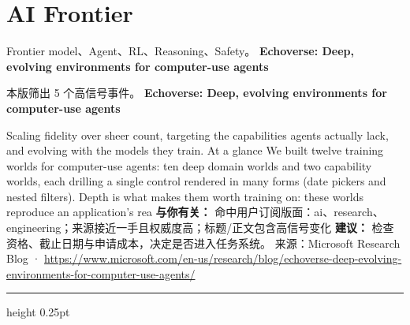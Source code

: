 \documentclass[10.5pt]{ctexart}
\begin{document}
\section*{AI Frontier}
{\color{ormuted} Frontier model、Agent、RL、Reasoning、Safety。}
\vspace{2mm}
{\LARGE\bfseries Echoverse: Deep, evolving environments for computer-use agents}\par
\vspace{1mm}
{\color{ormuted} 本版筛出 5 个高信号事件。}
\vspace{3mm}
{\Large\bfseries Echoverse: Deep, evolving environments for computer-use agents}\par
Scaling fidelity over sheer count, targeting the capabilities agents actually lack, and evolving with the models they train. At a glance We built twelve training worlds for computer-use agents: ten deep domain worlds and two capability worlds, each drilling a single control rendered in many forms (date pickers and nested filters). Depth is what makes them worth training on: these worlds reproduce an application’s rea
\textbf{与你有关：} 命中用户订阅版面：ai、research、engineering；来源接近一手且权威度高；标题/正文包含高信号变化
\textbf{建议：} 检查资格、截止日期与申请成本，决定是否进入任务系统。
{\footnotesize\color{ormuted} 来源：Microsoft Research Blog · \url{https://www.microsoft.com/en-us/research/blog/echoverse-deep-evolving-environments-for-computer-use-agents/}}
\vspace{4mm}
\hrule height 0.25pt
\vspace{3mm}
\end{document}
